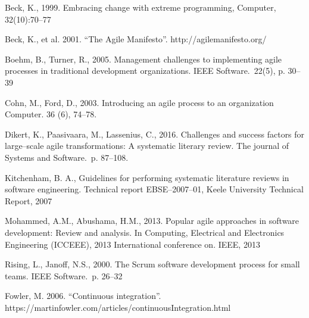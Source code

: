 \noindent [1] Beck, K., 1999. Embracing change with extreme programming, Computer,
32(10):70–77

\noindent [2] Beck, K., et al. 2001. ``The Agile Manifesto''.
http://agilemanifesto.org/

\noindent [3] Boehm, B., Turner, R., 2005. Management challenges to implementing agile
processes in traditional development organizations. IEEE Software.\ 22(5), p. 30–39

\noindent [4] Cohn, M., Ford, D., 2003. Introducing an agile process to an
organization Computer. 36 (6), 74–78.

\noindent [5] Dikert, K., Paasivaara, M., Lassenius, C., 2016. Challenges and success factors
for large–scale agile transformations: A systematic literary review. The journal
of Systems and Software.\ p. 87–108.

\noindent [6] Kitchenham, B. A., Guidelines for performing systematic literature
reviews in software engineering. Technical report EBSE–2007–01, Keele University
Technical Report, 2007

\noindent [7] Mohammed, A.M., Abushama, H.M., 2013. Popular agile approaches in software
development: Review and analysis. In Computing, Electrical and Electronics
Engineering (ICCEEE), 2013 International conference on. IEEE, 2013

\noindent [8] Rising, L., Janoff, N.S., 2000. The Scrum software development process for small teams. IEEE Software.\ p. 26–32

\noindent [9] Fowler, M. 2006. ``Continuous integration''.
https://martinfowler.com/articles/continuousIntegration.html

